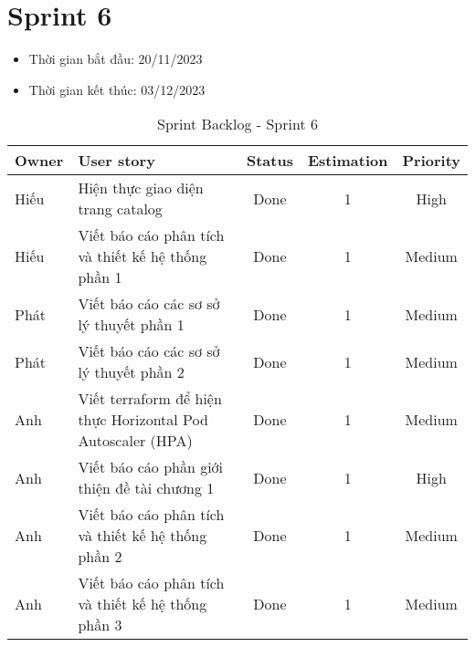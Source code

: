 \section{Sprint 6}
\begin{itemize}
    \item Thời gian bắt đầu: 20/11/2023
    \item Thời gian kết thúc: 03/12/2023
\end{itemize}
\begin{table}[H]
    \begin{tabular}{|m{2.5cm}|m{6cm}|c|c|c|}
    \hline
    \textbf{Owner}  & \textbf{User story}                                & \textbf{Status} & \textbf{Estimation} & \textbf{Priority} \\ \hline
    Hiếu               & Hiện thực giao diện trang catalog                    & Done            & 1                   & High           \\ \hline
    Hiếu               & Viết báo cáo phân tích và thiết kế hệ thống phần 1                     & Done            & 1                   & Medium          \\ \hline
    Phát               & Viết báo cáo các sơ sở lý thuyết phần 1                      & Done            & 1                   & Medium          \\ \hline
    Phát                & Viết báo cáo các sơ sở lý thuyết phần 2                     & Done            & 1                   & Medium          \\ \hline
    Anh                & Viết terraform để hiện thực Horizontal Pod Autoscaler (HPA)                     & Done            & 1                   & Medium          \\ \hline
    Anh                & Viết báo cáo phần giới thiện đề tài chương 1                    & Done            & 1                   & High         \\ \hline
    Anh                & Viết báo cáo phân tích và thiết kế hệ thống phần 2                     & Done            & 1                   & Medium          \\ \hline
    Anh                & Viết báo cáo phân tích và thiết kế hệ thống phần 3                    & Done            & 1                   & Medium          \\ \hline
    \end{tabular}
    \caption{Sprint Backlog - Sprint 6}
    \label{tab:sprint-6}
\end{table}
